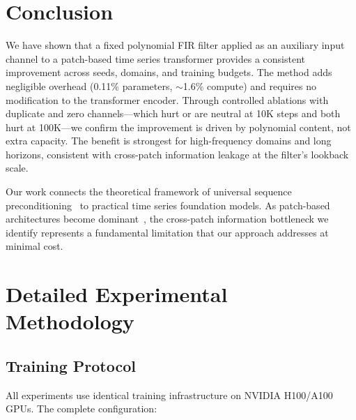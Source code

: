 \documentclass{article}
\begin{document}
\section{Conclusion}

We have shown that a fixed polynomial FIR filter applied as an auxiliary input channel to a patch-based time series transformer provides a consistent improvement across seeds, domains, and training budgets. The method adds negligible overhead (0.11\% parameters, $\sim$1.6\% compute) and requires no modification to the transformer encoder. Through controlled ablations with duplicate and zero channels---which hurt or are neutral at 10K steps and both hurt at 100K---we confirm the improvement is driven by polynomial content, not extra capacity. The benefit is strongest for high-frequency domains and long horizons, consistent with cross-patch information leakage at the filter's lookback scale.

Our work connects the theoretical framework of universal sequence preconditioning~\citep{marsden2024universal,hazan2017learning} to practical time series foundation models. As patch-based architectures become dominant~\citep{nie2023patchtst,woo2024unified,das2024decoder}, the cross-patch information bottleneck we identify represents a fundamental limitation that our approach addresses at minimal cost.




\newpage
\appendix
\section{Detailed Experimental Methodology}
\label{app:methodology}

\subsection{Training Protocol}

All experiments use identical training infrastructure on NVIDIA H100/A100 GPUs. The complete configuration:
\end{document}
